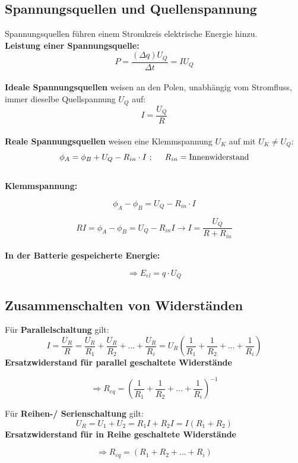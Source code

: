 \subsection{Spannungsquellen und Quellenspannung}
Spannungsquellen führen einem Stromkreis elektrische Energie hinzu. \\
\textbf{Leistung einer Spannungsquelle:}
\[
    P = \frac{(\Delta q) U_Q}{\Delta t} = I U_Q
\] 
\\[1ex]

\textbf{Ideale Spannungsquellen} weisen an den Polen, unabhängig vom Stromfluss, immer dieselbe Quellspannung $U_Q$ auf:
\[
    I = \frac{U_Q}{R}
\]
\\[1ex]
\textbf{Reale Spannungsquellen} weisen eine Klemmspannung $U_K$ auf mit $U_K \neq U_Q$:
\[
    \phi_A = \phi_B + U_Q - R_{in} \cdot I \ ; \hspace{5mm} R_{in} = \text{Innenwiderstand}
\]
\\[1ex]
\textbf{Klemmspannung:}
\begin{formulabox}
    \[
        \phi_A - \phi_B = U_Q - R_{in} \cdot I
    \]
\end{formulabox}
\[
    RI = \phi_A - \phi_B = U_Q - R_{in} I \rightarrow I = \frac{U_Q}{R + R_{in}}
\]
\\[1ex]
\textbf{In der Batterie gespeicherte Energie:}
\begin{formulabox}
    \[
        \Rightarrow E_{el} = q\cdot U_Q
    \]
\end{formulabox}

\subsection{Zusammenschalten von Widerständen}
Für \textbf{Parallelschaltung} gilt:
\[
    I = \frac{U_R}{R} = \frac{U_R}{R_1} + \frac{U_R}{R_2} + ... + \frac{U_R}{R_i} = U_R \left( \frac{1}{R_1} + \frac{1}{R_2} + ... + \frac{1}{R_i} \right)
\]
\textbf{Ersatzwiderstand für parallel geschaltete Widerstände}
\begin{formulabox}
    \[
       \Rightarrow R_{eq} = \left( \frac{1}{R_1} + \frac{1}{R_2} + ... + \frac{1}{R_i} \right)^{-1}
    \]
\end{formulabox}

Für \textbf{Reihen-/ Serienschaltung} gilt:
\[
    U_R = U_1 + U_2 = R_1 I + R_2 I = I(R_1 + R_2)
\]
\textbf{Ersatzwiderstand für in Reihe geschaltete Widerstände}
\begin{formulabox}
    \[
       \Rightarrow R_{eq} = ( R_1 + R_2 + ... + R_i)
    \]
\end{formulabox}

